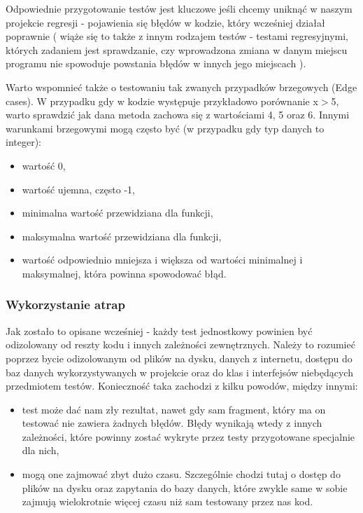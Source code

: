 Odpowiednie przygotowanie testów jest kluczowe jeśli chcemy uniknąć w naszym projekcie regresji - pojawienia się błędów w kodzie, który wcześniej działał poprawnie ( wiąże się to także z innym rodzajem testów - testami regresyjnymi, których zadaniem jest sprawdzanie, czy wprowadzona zmiana w danym miejscu programu nie spowoduje powstania błędów w innych jego miejscach \cite{RegressionTesting}). 

Warto wspomnieć także o testowaniu tak zwanych przypadków brzegowych (Edge cases). W przypadku gdy w kodzie występuje przykładowo porównanie x$>$5, warto sprawdzić jak dana metoda zachowa się z wartościami 4, 5 oraz 6. Innymi warunkami brzegowymi mogą często być (w przypadku gdy typ danych to integer): 
\begin{itemize}
    \item wartość 0,
    \item wartość ujemna, często -1,
    \item minimalna wartość przewidziana dla funkcji,
    \item maksymalna wartość przewidziana dla funkcji,
    \item wartość odpowiednio mniejsza i większa od wartości minimalnej i maksymalnej, która powinna spowodować błąd.
\end{itemize}

\subsubsection{Wykorzystanie atrap}
Jak zostało to opisane wcześniej - każdy test jednostkowy powinien być odizolowany od reszty kodu i innych zależności zewnętrznych. Należy to rozumieć poprzez bycie odizolowanym od plików na dysku, danych z internetu, dostępu do baz danych wykorzystywanych w projekcie oraz do klas i interfejsów niebędących przedmiotem testów. Konieczność taka zachodzi z kilku powodów, między innymi: 
\begin{itemize}
    \item test może dać nam zły rezultat, nawet gdy sam fragment, który ma on testować nie zawiera żadnych błędów. Błędy wynikają wtedy z innych zależności, które powinny zostać wykryte przez testy przygotowane specjalnie dla nich,
    \item mogą one zajmować zbyt dużo czasu. Szczególnie chodzi tutaj o dostęp do plików na dysku oraz zapytania do bazy danych, które zwykle same w sobie zajmują wielokrotnie więcej czasu niż sam testowany przez nas kod.
\end{itemize}

